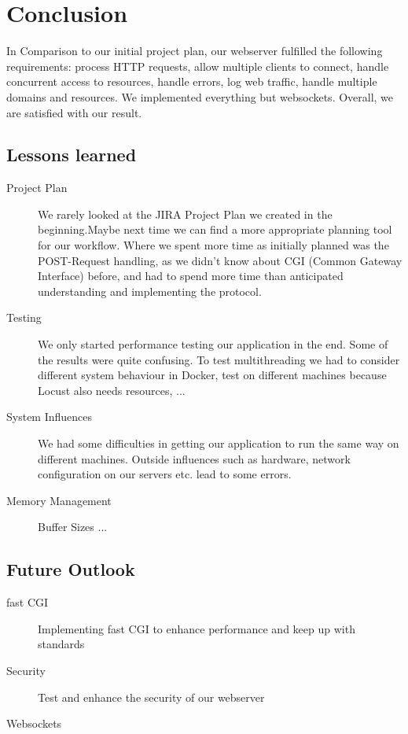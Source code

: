 \section*{Conclusion}
In Comparison to our initial project plan, our webserver fulfilled the following requirements: process HTTP requests, allow multiple clients to connect, handle concurrent access to resources, handle errors, log web traffic, handle multiple domains and resources. We implemented everything but websockets. Overall, we are satisfied with our result.


\subsection*{Lessons learned}
\begin{description}
    \item[Project Plan]We rarely looked at the JIRA Project Plan we created in the beginning.Maybe next time we can find a more appropriate planning tool for our workflow.
    Where we spent more time as initially planned was the POST-Request handling, as we didn't know about CGI (Common Gateway Interface) before, and had to spend more time than anticipated understanding and implementing the protocol. 
    \item[Testing] We only started performance testing our application in the end. Some of the results were quite confusing. To test multithreading we had to consider different system behaviour in Docker, test on different machines because Locust also needs resources, ...
    \item[System Influences]We had some difficulties in getting our application to run the same way on different machines. Outside influences such as hardware, network configuration on our servers etc. lead to some errors. 
    \item[Memory Management] Buffer Sizes ... 
\end{description}


\subsection*{Future Outlook}
\begin{description}
    \item[fast CGI]Implementing fast CGI to enhance performance and keep up with standards
    \item[Security]Test and enhance the security of our webserver
    \item[Websockets]
\end{description}
